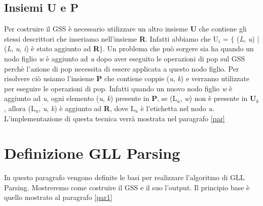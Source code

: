 \subsection{Insiemi U e P}
Per costruire il GSS è necessario utilizzare un altro insieme \textbf{U} che contiene gli stessi descrittori che inseriamo nell'insieme \textbf{R}. Infatti abbiamo che U$_i$ = $\{$ (\textit{L}, \textit{u}) $\mid$ (\textit{L}, \textit{u}, \textit{i}) è stato aggiunto ad \textbf{R}$\}$. Un problema \cite{pubblicazione: scott} che può sorgere sia ha quando un nodo figlio \textit{w} è aggiunto ad \textit{u} dopo aver eseguito le operazioni di pop sul GSS perchè l'azione di pop necessita di essere applicata a questo nodo figlio. Per risolvere ciò usiamo l'insieme \textbf{P} che contiene coppie (\textit{u}, \textit{k}) e verranno utilizzate per eseguire le operazioni di pop. Infatti quando un nuovo nodo figlio \textit{w} è aggiunto ad \textit{u}, ogni elemento (\textit{u}, \textit{k}) presente in \textbf{P}, se (L$_u$, \textit{w}) non è presente in \textbf{U$_k$}, allora (L$_u$, \textit{u}, \textit{k}) è aggiunto ad \textbf{R}, dove L$_u$ è l'etichetta nel nodo \textit{u}. L'implementazione di questa tecnica verrà mostrata nel paragrafo \ref{par}
\section{Definizione GLL Parsing}
In questo paragrafo vengono definite le basi per realizzare l'algoritmo di GLL Parsing. Mostreremo come costruire il GSS e il suo l'output. Il principio base è quello mostrato al paragrafo \ref{par1}
